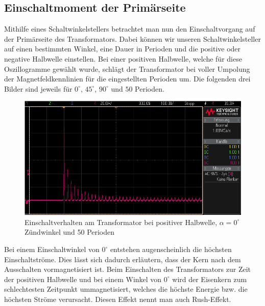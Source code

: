 \documentclass{article}
\begin{document}
\subsection{Einschaltmoment der Primärseite}
\label{sec:einsch-der-prim}

Mithilfe eines Schaltwinkelstellers betrachtet man nun den Einschaltvorgang auf der Primärseite des Transformators. Dabei können wir unseren Schaltwinkelsteller auf einen bestimmten Winkel, eine Dauer in Perioden und die positive oder negative Halbwelle einstellen.
Bei einer positiven Halbwelle, welche für diese Oszillogramme gewählt wurde, schlägt der Transformator bei voller Umpolung der Magnetfeldkennlinien für die eingestellten Perioden um. Die folgenden drei Bilder sind jeweils für $0^{\circ}$, $45^{\circ}$, $90^{\circ}$ und $50$ Perioden.

\begin{figure}[h]
  \centering
  \includegraphics[width=\textwidth]{../assets/images/gep3/einschalt_0deg.PNG}
  \caption{Einschaltverhalten am Transformator bei positiver Halbwelle, $\alpha = 0^\circ$ Zündwinkel und 50 Perioden}
  \label{fig:einschalt_0d}
\end{figure}

Bei einem Einschaltwinkel von $0^{\circ}$ entstehen augenscheinlich die höchsten Einschaltströme. Dies lässt sich dadurch erläutern, dass der Kern nach dem Ausschalten vormagnetisiert ist. Beim Einschalten des Transformators zur Zeit der positiven Halbwelle und bei einem Winkel von $0^{\circ}$ wird der Eisenkern zum schlechtesten Zeitpunkt ummagnetisiert, welches die höchste Energie bzw. die höchsten Ströme verursacht. Diesen Effekt nennt man auch Rush-Effekt.
\end{document}
